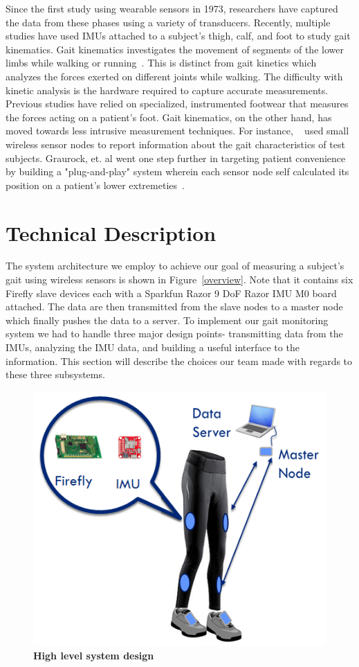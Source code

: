 \documentclass[conference]{IEEEtran}
\begin{document}
Since the first study using wearable sensors in 1973, researchers have captured the data
from these phases using a variety of transducers. Recently, multiple studies have used
IMUs attached to a subject’s thigh, calf, and foot to study gait kinematics. Gait
kinematics investigates the movement of segments of the lower limbs while walking or
running~\cite{run}. This is distinct from gait kinetics which analyzes the forces exerted on
different joints while walking. The difficulty with kinetic analysis is the hardware
required to capture accurate measurements. Previous studies have relied on specialized,
instrumented footwear that measures the forces acting on a patient’s foot. Gait
kinematics, on the other hand, has moved towards less intrusive measurement techniques.
For instance, ~\cite{walkers} used small wireless sensor nodes to report information about the gait
characteristics of test subjects. Graurock, et. al went one step further in targeting
patient convenience by building a "plug-and-play" system wherein each sensor node self
calculated its position on a patient's lower extremeties~\cite{pairing}.  

\section{Technical Description}
The system architecture we employ to achieve our goal of measuring a subject's gait using
wireless sensors is shown in Figure~\ref{overview}. Note that it contains six Firefly
slave devices each with a Sparkfun Razor 9 DoF Razor IMU M0 board attached. The data are
then transmitted from the slave nodes to a master node which finally pushes the data to a
server. To implement our gait monitoring system we had to handle three major design
points- transmitting data from the IMUs, analyzing the IMU data, and building a useful
interface to the information. This section will describe the choices our team made with
regards to these three subsystems. 

\begin{figure}[h]
  \centering
  \includegraphics[width=0.75\columnwidth]{figs/sysarch}
  \caption{{\bf High level system design}}
  \label{fig:overview}
\end{figure}
\end{document}
